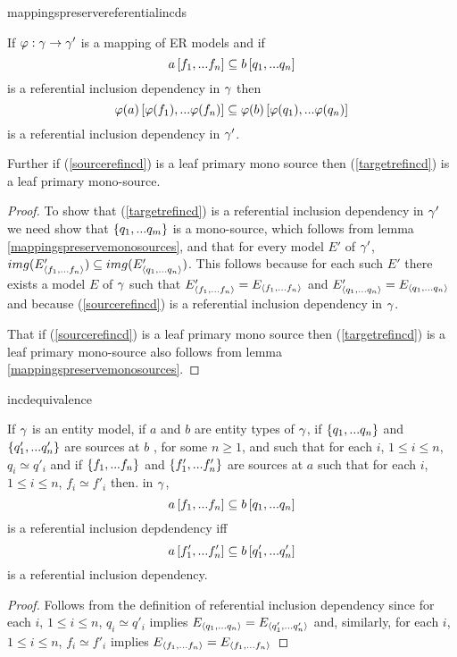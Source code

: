 mappingspreservereferentialincds
\begin{lemma}
\label{mappingspreservereferentialincds}
If $\varphi: \gamma \rightarrow \gamma'$ is a mapping of ER models and
if 
\begin{equation}
\label{sourcerefincd}
a\left[f_1,...f_n\right]\subseteq b\left[q_1,...q_n\right]
\end{equation}
is a referential inclusion dependency in $\gamma$ then  
\begin{equation}
\label{targetrefincd}
\varphi(a)\left[\varphi(f_1),...\varphi(f_n)\right]\subseteq\varphi(b)\left[\varphi(q_1),...\varphi(q_n)\right]
\end{equation}
is a referential inclusion dependency in $\gamma'$. 

Further if (\ref{sourcerefincd}) is a leaf primary mono source then (\ref{targetrefincd}) is a leaf primary mono-source.
\end{lemma}
\begin{proof}
To show that (\ref{targetrefincd}) is a referential inclusion dependency
 in $\gamma'$ we need show that $\left\{q_1,...q_m\right\}$ is a mono-source, which follows from lemma \ref{mappingspreservemonosources}, and that for every model $E'$ of $\gamma'$, 
$img(E'_{\langle f_1,...f_n\rangle}) \subseteq img(E'_{\langle q_1,...q_n\rangle})$. 
This follows because for each such $E'$ there exists a model $E$ of $\gamma$ such that 
$E'_{\langle f_1,...f_n\rangle}=E_{\langle f_1,...f_n\rangle}$ and $E'_{\langle q_1,...q_n\rangle}=E_{\langle q_1,...q_n\rangle}$ and because 
(\ref{sourcerefincd}) is a referential inclusion dependency in $\gamma$.

That if  (\ref{sourcerefincd}) is a leaf primary mono source then (\ref{targetrefincd}) is a leaf primary mono-source also follows from lemma \ref{mappingspreservemonosources}.
\end{proof}




incdequivalence
\begin{lemma}
\label{incdequivalence}
If $\gamma$ is an entity model, 
if $a$ and $b$ are entity types of  $\gamma$,  if $\left\{q_1,...q_n\right\}$
and $\left\{q'_1,...q'_n\right\}$ are sources at $b$ , for some $n \geq 1$,
and such that for each $i$, $1 \leq i \leq n$, $q_i \simeq q'_i$  
and if $\left\{f_1,...f_n\right\}$ and $\left\{f'_1,...f'_n\right\}$ are sources at $a$
such that for each $i$, $1 \leq i \leq n$, $f_i \simeq f'_i$
then. in $\gamma$, 
\begin{equation}
\label{incdequivalence1}
a\left[f_1,...f_n\right]\subseteq b\left[q_1,...q_n\right]
\end{equation}
is a referential inclusion depdendency iff
\begin{equation}
\label{incdequivalence2}
a\left[f'_1,...f'_n\right]\subseteq b\left[q'_1,...q'_n\right]
\end{equation}
is a referential inclusion dependency.

\end{lemma}
\begin{proof}
Follows from the definition of referential inclusion dependency
 since for each $i$, $1 \leq i \leq n$, $q_i \simeq q'_i$  implies $E_{\langle q_1,...q_n\rangle} =
E_{\langle q'_1,...q'_n\rangle}$ and,
similarly, for each $i$, $1 \leq i \leq n$, $f_i \simeq f'_i$  implies $E_{\langle f_1,...f_n\rangle} =
E_{\langle f_1,...f_n\rangle}$
\end{proof}

